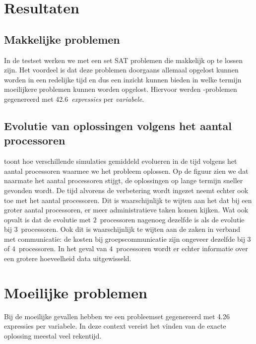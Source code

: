 \section{Resultaten}

\subsection{Makkelijke problemen}

In de testset werken we met een set SAT problemen die makkelijk op te lossen zijn. Het voordeel is dat deze problemen doorgaans allemaal opgelost kunnen worden in een redelijke tijd en dus een inzicht kunnen bieden in welke termijn moeilijkere problemen kunnen worden opgelost. Hiervoor werden -problemen gegenereerd met 42.6~\emph{expressies} per \emph{variabele}.

\subsection{Evolutie van oplossingen volgens het aantal processoren}


 toont hoe verschillende simulaties gemiddeld evolueren in de tijd volgens het aantal processoren waarmee we het probleem oplossen. Op de figuur zien we dat naarmate het aantal processoren stijgt, de oplossingen op lange termijn sneller gevonden wordt. De tijd alvorens de verbetering wordt ingezet neemt echter ook toe met het aantal processoren. Dit is waarschijnlijk te wijten aan het dat bij een groter aantal processoren, er meer administratieve taken komen kijken. Wat ook opvalt is dat de evolutie met $2$~processoren nagenoeg dezelfde is als de evolutie bij $3$~processoren. Ook dit is waarschijnlijk te wijten aan de zaken in verband met communicatie: de kosten bij groepscommunicatie zijn ongeveer dezelfde bij $3$ of $4$~processoren. In het geval van $4$~processoren wordt er echter informatie over een grotere hoeveelheid data uitgewisseld.

\section{Moeilijke problemen}


Bij de moeilijke gevallen hebben we een probleemset gegenereerd met 4.26 expressies per variabele. In deze context vereist het vinden van de exacte oplossing meestal veel rekentijd. 

